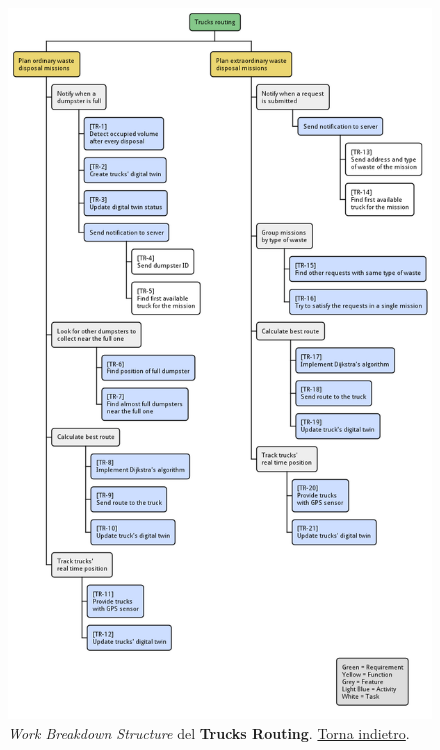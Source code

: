 \begin{figure}[H]
    \centering
    \includegraphics[width=\textwidth]{../img/wbs-trucks-routing.pm}
    \caption{\textit{Work Breakdown Structure} del \textbf{Trucks Routing}. \hyperlink{back:wbs-trucks-routing}{Torna indietro}.}
    \label{fig:wbs-trucks-routing}
\end{figure}

